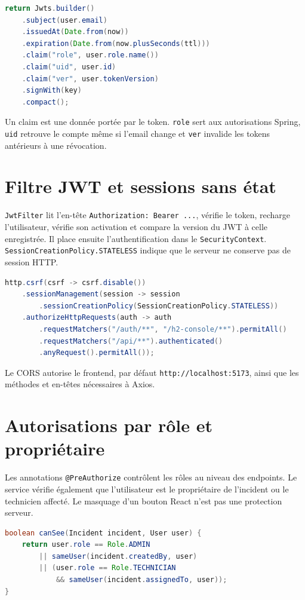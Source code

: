 \documentclass[12pt,a4paper,oneside]{report}
\begin{document}
\begin{lstlisting}[language=Java,caption={Claims inclus dans le JWT}]
return Jwts.builder()
    .subject(user.email)
    .issuedAt(Date.from(now))
    .expiration(Date.from(now.plusSeconds(ttl)))
    .claim("role", user.role.name())
    .claim("uid", user.id)
    .claim("ver", user.tokenVersion)
    .signWith(key)
    .compact();
\end{lstlisting}

Un claim est une donnée portée par le token. \texttt{role} sert aux autorisations Spring, \texttt{uid} retrouve le compte même si l'email change et \texttt{ver} invalide les tokens antérieurs à une révocation.

\section{Filtre JWT et sessions sans état}
\texttt{JwtFilter} lit l'en-tête \texttt{Authorization: Bearer ...}, vérifie le token, recharge l'utilisateur, vérifie son activation et compare la version du JWT à celle enregistrée. Il place ensuite l'authentification dans le \texttt{SecurityContext}. \texttt{SessionCreationPolicy.STATELESS} indique que le serveur ne conserve pas de session HTTP.

\begin{lstlisting}[language=Java,caption={Extrait de la configuration Spring Security}]
http.csrf(csrf -> csrf.disable())
    .sessionManagement(session -> session
        .sessionCreationPolicy(SessionCreationPolicy.STATELESS))
    .authorizeHttpRequests(auth -> auth
        .requestMatchers("/auth/**", "/h2-console/**").permitAll()
        .requestMatchers("/api/**").authenticated()
        .anyRequest().permitAll());
\end{lstlisting}

Le CORS autorise le frontend, par défaut \texttt{http://localhost:5173}, ainsi que les méthodes et en-têtes nécessaires à Axios.

\section{Autorisations par rôle et propriétaire}
Les annotations \texttt{@PreAuthorize} contrôlent les rôles au niveau des endpoints. Le service vérifie également que l'utilisateur est le propriétaire de l'incident ou le technicien affecté. Le masquage d'un bouton React n'est pas une protection serveur.

\begin{lstlisting}[language=Java,caption={Contrôle d'accès sur un incident}]
boolean canSee(Incident incident, User user) {
    return user.role == Role.ADMIN
        || sameUser(incident.createdBy, user)
        || (user.role == Role.TECHNICIAN
            && sameUser(incident.assignedTo, user));
}
\end{lstlisting}
\end{document}
